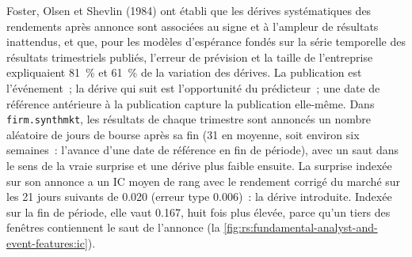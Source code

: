 Foster, Olsen et Shevlin (1984) ont établi que les dérives systématiques des rendements après annonce sont associées au signe et à l'ampleur de
résultats inattendus, et que, pour les modèles d'espérance fondés sur la série temporelle des résultats trimestriels publiés, l'erreur de prévision et la taille
de l'entreprise expliquaient 81~\% et 61~\% de la variation des dérives. La publication est l'événement~; la dérive qui suit est l'opportunité du prédicteur~; une
date de référence antérieure à la publication capture la publication elle-même. Dans \texttt{firm.synthmkt}, les résultats de chaque trimestre sont annoncés un nombre aléatoire de jours de bourse après sa fin (31 en moyenne, soit environ six semaines~: l'avance d'une date de référence en fin de période), avec un saut dans le sens de la vraie
surprise et une dérive plus faible ensuite. La surprise indexée sur son annonce a un IC moyen de rang avec le rendement corrigé du
marché sur les 21 jours suivants de 0.020 (erreur type 0.006)~: la dérive introduite. Indexée sur la fin de période, elle vaut 0.167, huit fois plus élevée, parce qu'un tiers des
fenêtres contiennent le saut de l'annonce (la \cref{fig:rs:fundamental-analyst-and-event-features:ic}).

\begin{omfigure}

\label{fig:rs:fundamental-analyst-and-event-features:ic}
\end{omfigure}

